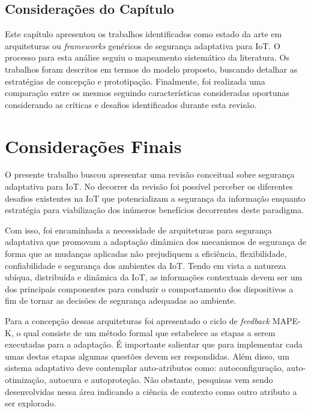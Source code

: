 \documentclass[tid,table]{texufpel} %
\newcommand {\AY} {\todo[inline, color=green]} %
\begin{document}
\section{Considerações do Capítulo}

Este capítulo apresentou os trabalhos identificados como estado da arte em arquiteturas ou \textit{frameworks} genéricos de segurança adaptativa para IoT. O processo para esta análise seguiu o mapeamento sistemático da literatura. Os trabalhos foram descritos em termos do modelo proposto, buscando detalhar as estratégias de concepção e prototipação. Finalmente, foi realizada uma comparação entre os mesmos seguindo características consideradas oportunas considerando as críticas e desafios identificados durante esta revisão. 


\chapter{Considerações Finais}

O presente trabalho buscou apresentar uma revisão conceitual sobre segurança adaptativa para IoT. No decorrer da revisão foi possível perceber os diferentes desafios existentes na IoT que potencializam a segurança da informação enquanto estratégia para viabilização dos inúmeros benefícios decorrentes deste paradigma. 

Com isso, foi encaminhada a necessidade de arquiteturas para segurança adaptativa que promovam a adaptação dinâmica dos mecanismos de segurança de forma que as mudanças aplicadas não prejudiquem a eficiência, flexibilidade, confiabilidade e segurança dos ambientes da IoT. Tendo em vista a natureza ubíqua,
distribuída e dinâmica da IoT, as informações contextuais devem ser um dos principais componentes para conduzir o comportamento dos dispositivos a fim de tornar as decisões de segurança adequadas ao ambiente. 

Para a concepção dessas arquiteturas foi apresentado o ciclo de \textit{feedback} MAPE-K, o qual consiste de um método formal que estabelece as etapas a serem executadas para a adaptação. É importante salientar que para implementar cada umas destas etapas algumas questões devem ser respondidas. Além disso, um sistema adaptativo deve contemplar auto-atributos como: autoconfiguração, auto-otimização, autocura e autoproteção. Não obstante, pesquisas vem sendo desenvolvidas nessa área indicando a ciência de contexto como outro atributo a ser explorado.
\end{document}
